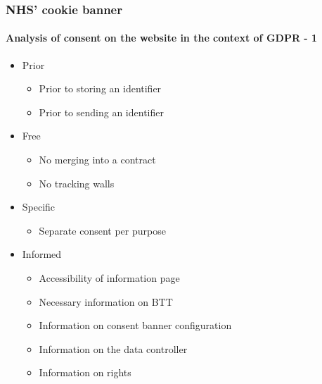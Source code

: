 \documentclass[aspectratio=43]{beamer}
\begin{document}
\begin{frame}
    \frametitle{NHS' cookie banner}
    \framesubtitle{Analysis of consent on the website in the context of GDPR - 1}
    \begin{itemize}
        \item Prior
        \begin{itemize}
            \item Prior to storing an identifier
            \item Prior to sending an identifier
        \end{itemize}
        \item Free
        \begin{itemize}
            \item No merging into a contract
            \item No tracking walls
        \end{itemize}
        \item Specific
        \begin{itemize}
            \item Separate consent per purpose
        \end{itemize}
        \item Informed
        \begin{itemize}
            \item Accessibility of information page
            \item Necessary information on BTT
            \item Information on consent banner configuration
            \item Information on the data controller
            \item Information on rights
        \end{itemize}
    \end{itemize}
\end{frame}
\end{document}
